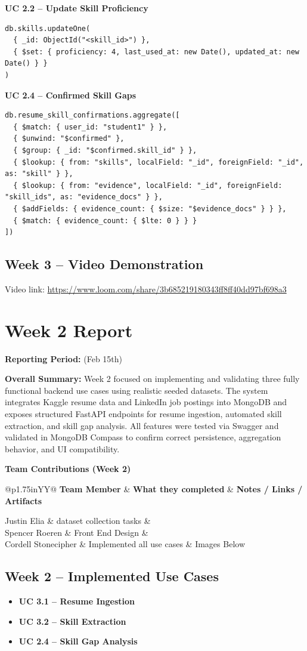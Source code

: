 \documentclass[11pt]{article}
\makeatletter
\newcommand{\WeekReport}[4]{
  \clearpage
  \section*{Week #1 Report}
  \addcontentsline{toc}{section}{Week #1 Report}
  \vspace{-0.25em}
  \noindent\textbf{Reporting Period:} #2

  \vspace{0.5em}
  \noindent\textbf{Overall Summary:} #3

  \vspace{0.75em}
  \noindent\textbf{Team Contributions (Week #1)}
  \vspace{0.25em}

  \begin{table}[H]
    \renewcommand{\arraystretch}{1.2}
    \begin{tabularx}{\linewidth}{@{}p{1.75in}YY@{}}
      \toprule
      \textbf{Team Member} & \textbf{What they completed} & \textbf{Notes / Links / Artifacts} \\
      \midrule
      #4
      \bottomrule
    \end{tabularx}
  \end{table}
}
\makeatother
\begin{document}
\noindent
\textbf{UC 2.2 -- Update Skill Proficiency}
\begin{verbatim}
db.skills.updateOne(
  { _id: ObjectId("<skill_id>") },
  { $set: { proficiency: 4, last_used_at: new Date(), updated_at: new Date() } }
)
\end{verbatim}

\noindent
\textbf{UC 2.4 -- Confirmed Skill Gaps}
\begin{verbatim}
db.resume_skill_confirmations.aggregate([
  { $match: { user_id: "student1" } },
  { $unwind: "$confirmed" },
  { $group: { _id: "$confirmed.skill_id" } },
  { $lookup: { from: "skills", localField: "_id", foreignField: "_id", as: "skill" } },
  { $lookup: { from: "evidence", localField: "_id", foreignField: "skill_ids", as: "evidence_docs" } },
  { $addFields: { evidence_count: { $size: "$evidence_docs" } } },
  { $match: { evidence_count: { $lte: 0 } } }
])
\end{verbatim}

\subsection*{Week 3 -- Video Demonstration}
\noindent
Video link: \href{https://www.loom.com/share/3b685219180343ff8ff40dd97bf698a3}{https://www.loom.com/share/3b685219180343ff8ff40dd97bf698a3}



\WeekReport{2}{(Feb 15th)}{
Week 2 focused on implementing and validating three fully functional backend use cases using realistic seeded datasets. The system integrates Kaggle resume data and LinkedIn job postings into MongoDB and exposes structured FastAPI endpoints for resume ingestion, automated skill extraction, and skill gap analysis. All features were tested via Swagger and validated in MongoDB Compass to confirm correct persistence, aggregation behavior, and UI compatibility.

}{
Justin Elia & dataset collection tasks & \\
Spencer Roeren & Front End Design &  \\
Cordell Stonecipher & Implemented all use cases & Images Below\\
}

\subsection*{Week 2 -- Implemented Use Cases}
\begin{itemize}
  \item \textbf{UC 3.1 -- Resume Ingestion}
  \item \textbf{UC 3.2 -- Skill Extraction}
  \item \textbf{UC 2.4 -- Skill Gap Analysis}
\end{itemize}
\end{document}
